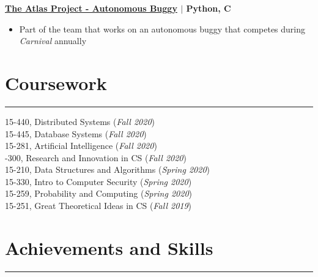\documentclass[10pt]{article}
\newcommand{\CC}{C\nolinebreak\hspace{-.05em}\raisebox{.4ex}{\tiny\bf +}\nolinebreak\hspace{-.10em}\raisebox{.4ex}{\tiny\bf +}}
\begin{document}
  \textbf{\large \href{https://sites.google.com/view/atlasbuggy/}{The Atlas Project - Autonomous Buggy} $\mid$ Python, \CC} 
  \vspace*{-0.25cm}
  \begin{itemize}
    \itemsep0em
    \item Part of the team that works on an autonomous buggy that competes during \textit{Carnival} annually
  \end{itemize}

  \vspace*{-0.6cm}
  \section*{\LARGE Coursework}
    \vspace*{-0.1cm}
    \hrule depth 0.2mm \relax
    \vspace*{-0.3cm}

    \begin{multicols}{2}
       15-440, Distributed Systems (\textit{Fall 2020}) \\
       15-445, Database Systems (\textit{Fall 2020}) \\
       15-281, Artificial Intelligence (\textit{Fall 2020}) \\
       -300, Research and Innovation in CS (\textit{Fall 2020}) \\
       15-210, Data Structures and Algorithms (\textit{Spring 2020}) \\
       15-330, Intro to Computer Security (\textit{Spring 2020}) \\
       15-259, Probability and Computing (\textit{Spring 2020}) \\
       15-251, Great Theoretical Ideas in CS (\textit{Fall 2019})
    \end{multicols}


  \vspace*{-0.6cm}
  \section*{\LARGE Achievements and Skills}
  \vspace*{-0.1cm}
  \hrule depth 0.2mm \relax
  \vspace*{0.2cm}
\end{document}
